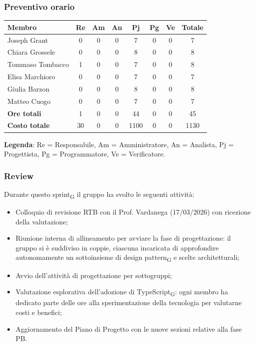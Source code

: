 \documentclass[11pt,a4paper]{article}
\newcommand{\gls}[1]{#1\textsubscript{G}}
\begin{document}
\subsubsection{Preventivo orario}
\begin{center}
    \begin{tabular}{|l|c|c|c|c|c|c|c|}
        \hline
        \textbf{Membro} & \textbf{Re} & \textbf{Am} & \textbf{An} & \textbf{Pj} & \textbf{Pg} & \textbf{Ve} & \textbf{Totale} \\
        \hline
        Joseph Grant & 0 & 0 & 0 & 7 & 0 & 0 & 7 \\
        \hline
        Chiara Grossele & 0 & 0 & 0 & 8 & 0 & 0 & 8 \\
        \hline
        Tommaso Tombacco & 1 & 0 & 0 & 7 & 0 & 0 & 8 \\
        \hline
        Elisa Marchioro & 0 & 0 & 0 & 7 & 0 & 0 & 7 \\
        \hline
        Giulia Barzon & 0 & 0 & 0 & 8 & 0 & 0 & 8 \\
        \hline
        Matteo Cuogo & 0 & 0 & 0 & 7 & 0 & 0 & 7 \\
        \hline
        \textbf{Ore totali} & 1 & 0 & 0 & 44 & 0 & 0 & 45 \\
        \hline
        \textbf{Costo totale} & 30 & 0 & 0 & 1100 & 0 & 0 & 1130 \\
        \hline
    \end{tabular}
\end{center}

\noindent \textbf{Legenda}: Re = Responsabile, Am = Amministratore, An = Analista, Pj = Progettista, Pg = Programmatore, Ve = Verificatore.

\subsubsection{Review}
Durante questo \gls{sprint} il gruppo ha svolto le seguenti attività:
\begin{itemize}
    \item Colloquio di revisione RTB con il Prof. Vardanega (17/03/2026) con ricezione della valutazione;
    \item Riunione interna di allineamento per avviare la fase di progettazione: il gruppo si è suddiviso in coppie, ciascuna incaricata di approfondire autonomamente un sottoinsieme di \gls{design pattern} e scelte architetturali;
    \item Avvio dell'attività di progettazione per sottogruppi;
    \item Valutazione esplorativa dell'adozione di \gls{TypeScript}: ogni membro ha dedicato parte delle ore alla sperimentazione della tecnologia per valutarne costi e benefici;
    \item Aggiornamento del Piano di Progetto con le nuove sezioni relative alla fase PB.
\end{itemize}
\end{document}
